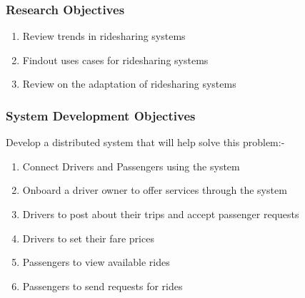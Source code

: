 \subsubsection{Research Objectives}
\begin{enumerate}
    \item Review trends in ridesharing systems
    \item Findout uses cases for ridesharing systems
    \item Review on the adaptation of ridesharing systems
\end{enumerate}

\subsubsection{System Development Objectives}
Develop a distributed system that will help solve this problem:-

\begin{enumerate}
    \item Connect Drivers and Passengers using the system
    \item Onboard a driver owner to offer services through the system
    \item Drivers to post about their trips and accept passenger requests
    \item Drivers to set their fare prices
    \item Passengers to view available rides
    \item Passengers to send requests for rides
\end{enumerate}
